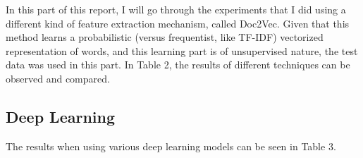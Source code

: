 \documentclass{article}
\begin{document}
In this part of this report, I will go through the experiments that I did using a different kind of feature extraction mechanism, called Doc2Vec. Given that this method learns a probabilistic (versus frequentist, like TF-IDF) vectorized representation of words, and this learning part is of unsupervised nature, the test data was used in this part. In Table 2, the results of different techniques can be observed and compared. 

\begin{table}[]
\caption{Doc2Vec Results}
\label{my-label}
\end{table}

	\subsection{Deep Learning}

	The results when using various deep learning models can be seen in Table 3. 
	
\end{document}
